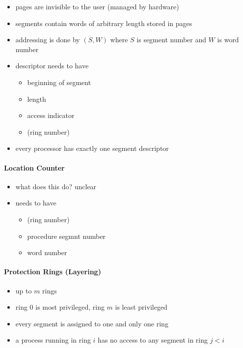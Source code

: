 \documentclass[
  12pt]{findlay}
\providecommand{\tightlist}{%
  \setlength{\itemsep}{0pt}\setlength{\parskip}{0pt}}
\begin{document}
\begin{itemize}
\tightlist
\item
  pages are invisible to the user (managed by hardware)
\item
  segments contain words of arbitrary length stored in pages
\item
  addressing is done by \((S,W)\) where \(S\) is segment number and
  \(W\) is word number
\item
  descriptor needs to have

  \begin{itemize}
  \tightlist
  \item
    beginning of segment
  \item
    length
  \item
    access indicator
  \item
    (ring number)
  \end{itemize}
\item
  every processor has exactly one segment descriptor
\end{itemize}

\hypertarget{location-counter}{%
\paragraph{Location Counter}\label{location-counter}}

\begin{itemize}
\tightlist
\item
  what does this do? unclear
\item
  needs to have

  \begin{itemize}
  \tightlist
  \item
    (ring number)
  \item
    procedure segmnt number
  \item
    word number
  \end{itemize}
\end{itemize}

\hypertarget{protection-rings-layering}{%
\paragraph{Protection Rings
(Layering)}\label{protection-rings-layering}}

\begin{itemize}
\tightlist
\item
  up to \(m\) rings
\item
  ring 0 is most privileged, ring \(m\) is least privileged
\item
  every segment is assigned to one and only one ring
\item
  a process running in ring \(i\) has no access to any segment in ring
  \(j < i\)
\end{itemize}

\printbibliography
\end{document}
